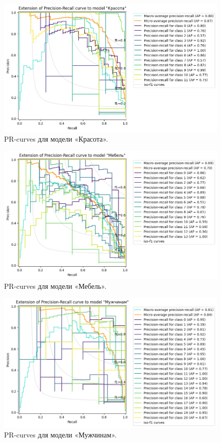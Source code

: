 \documentclass[a4paper,12pt]{extarticle}
\begin{document}
\begin{figure}[hbtp]
	\centering
	\includegraphics[scale=0.7]{pr_curves/prcurve_Красота.png}
	\caption{PR-curves для модели «Красота».}
	\label{fig:prcurve_Красота}
\end{figure}

\begin{figure}[hbtp]
	\centering
	\includegraphics[scale=0.7]{pr_curves/prcurve_Мебель.png}
	\caption{PR-curves для модели «Мебель».}
	\label{fig:prcurve_Мебель}
\end{figure}

\begin{figure}[hbtp]
	\centering
	\includegraphics[scale=0.7]{pr_curves/prcurve_Мужчинам.png}
	\caption{PR-curves для модели «Мужчинам».}
	\label{fig:prcurve_Мужчинам}
\end{figure}
\end{document}
